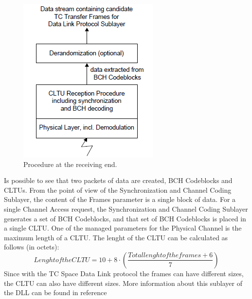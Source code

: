 \begin{figure}[H]
\begin{center}
\includegraphics[scale=1]{proceduresreceivingend.PNG}  
\caption{Procedure at the receiving end.}
\end{center}
\end{figure}
Is possible to see that two packets of data are created, BCH Codeblocks and CLTUs. From the point of view of the Synchronization and Channel Coding Sublayer, the content of
the Frames parameter is a single block of data. For a single Channel Access request, the Synchronization and Channel Coding Sublayer
generates a set of BCH Codeblocks, and that set of BCH Codeblocks is placed in a single
CLTU. One of the managed parameters for the Physical Channel is the maximum length of a
CLTU. The lenght of the CLTU can be calculated as follows (in octets): 
\begin{equation}
Lenght of the CLTU=10+8\cdot(\frac{Total lenght of the frames+6}{7})
\end{equation} 
Since with the TC Space Data Link protocol the frames can have different sizes, the CLTU can also have different sizes. More information about this sublayer of the DLL can be found in reference \cite{Synchronization2012}

%
% 
%
